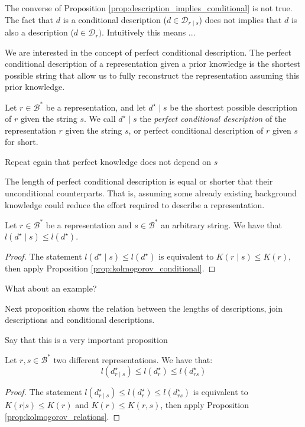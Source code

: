 The converse of Proposition \ref{prop:description_implies_conditional} is not true. The fact that $d$ is a conditional description ($d \in \mathcal{D}_{r \mid s}$) does not implies that $d$ is also a description ($d \in \mathcal{D}_{r})$. {\color{red} Intuitively this means ...}

We are interested in the concept of perfect conditional description. The perfect conditional description of a representation given a prior knowledge is the shortest possible string that allow us to fully reconstruct the representation assuming this prior knowledge.

\begin{definition}
Let $r \in \mathcal{B}^\ast$ be a representation, and let $d^\star \mid s$ be the shortest possible description of $r$ given the string $s$. We call $d^\star \mid s$ the \emph{perfect conditional description} of the representation $r$ given the string $s$, or perfect conditional description of $r$ given $s$ for short.
\end{definition}

{\color{red} Repeat egain that perfect knowledge does not depend on $s$}

The length of perfect conditional description is equal or shorter that their unconditional counterparts. That is, assuming some already existing background knowledge could reduce the effort required to describe a representation.

\begin{proposition}
\label{prop:description_conditional_inequality}
Let $r \in \mathcal{B}^\ast$ be a representation and $s \in \mathcal{B}^\ast$ an arbitrary string. We have that $l \left( d^\star \mid s \right) \leq l \left( d^\star \right)$.
\end{proposition}
\begin{proof}
The statement $l \left( d^\star \mid s \right) \leq l \left( d^\star \right)$ is equivalent to $K(r \mid s) \leq K(r)$, then apply Proposition \ref{prop:kolmogorov_conditional}.
\end{proof}

{\color{red} What about an example?}

Next proposition shows the relation between the lengths of descriptions, join descriptions and conditional descriptions.

{\color{red} Say that this is a very important proposition}

\begin{proposition}
\label{prop:description_conditional_joint}
Let $r, s \in \mathcal{B}^\ast$ two different representations. We have that:
\[
l \left( d^\star_{r \mid s} \right) \leq l \left( d^\star_r \right) \leq l \left( d^\star_{rs} \right)
\]
\end{proposition}
\begin{proof}
The statement $l \left( d^\star_{r \mid s} \right) \leq l \left( d^\star_r \right) \leq l \left( d^\star_{rs} \right)$ is equivalent to $K(r | s ) \leq K(r)$ and $K(r) \leq K(r, s)$, then apply Proposition \ref{prop:kolmogorov_relations}.
\end{proof}

